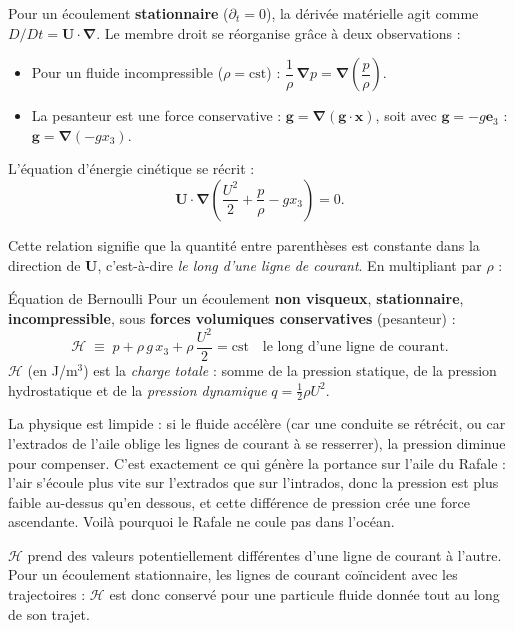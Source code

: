 \documentclass[11pt,a4paper]{report}
\begin{document}
Pour un écoulement \textbf{stationnaire} ($\partial_t = 0$), la dérivée matérielle
agit comme $D/Dt = \bm{U}\cdot\boldsymbol{\nabla}$. Le membre droit se réorganise
grâce à deux observations :
\begin{itemize}
    \item Pour un fluide incompressible ($\rho = \text{cst}$) :
    $\dfrac{1}{\rho}\,\boldsymbol{\nabla}p = \boldsymbol{\nabla}\!\left(\dfrac{p}{\rho}\right)$.
    \item La pesanteur est une force conservative :
    $\bm{g} = \boldsymbol{\nabla}(\bm{g}\cdot\bm{x})$, soit avec
    $\bm{g} = -g\bm{e}_3$ : $\bm{g} = \boldsymbol{\nabla}(-gx_3)$.
\end{itemize}

L'équation d'énergie cinétique se récrit :
\[
    \bm{U}\cdot\boldsymbol{\nabla}\!\left(\frac{U^2}{2} + \frac{p}{\rho} - gx_3\right) = 0.
\]

Cette relation signifie que la quantité entre parenthèses est constante dans la
direction de $\bm{U}$, c'est-à-dire \textit{le long d'une ligne de courant}.
En multipliant par $\rho$ :

\begin{importantbox}{Équation de Bernoulli}
Pour un écoulement \textbf{non visqueux}, \textbf{stationnaire},
\textbf{incompressible}, sous \textbf{forces volumiques conservatives}
(pesanteur) :
\[
    \mathcal{H} \;\equiv\; p + \rho\,g\,x_3 + \rho\,\frac{U^2}{2} = \text{cst}
    \quad \text{le long d'une ligne de courant.}
\]
$\mathcal{H}$ (en J/m$^3$) est la \emph{charge totale} : somme de la pression
statique, de la pression hydrostatique et de la \emph{pression dynamique}
$q = \tfrac{1}{2}\rho U^2$.
\end{importantbox}

La physique est limpide : si le fluide accélère (car une conduite se rétrécit, ou
car l'extrados de l'aile oblige les lignes de courant à se resserrer), la pression
diminue pour compenser. C'est exactement ce qui génère la portance sur l'aile du
Rafale : l'air s'écoule plus vite sur l'extrados que sur l'intrados, donc la
pression est plus faible au-dessus qu'en dessous, et cette différence de pression
crée une force ascendante. Voilà pourquoi le Rafale ne coule pas dans l'océan.

$\mathcal{H}$ prend des valeurs potentiellement différentes d'une ligne de courant
à l'autre. Pour un écoulement stationnaire, les lignes de courant coïncident avec
les trajectoires : $\mathcal{H}$ est donc conservé pour une particule fluide donnée
tout au long de son trajet.
\end{document}
